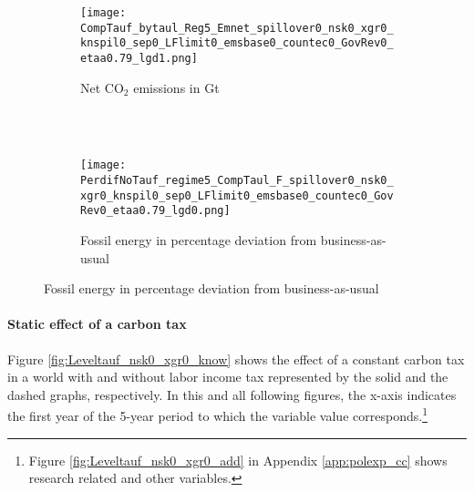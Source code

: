 \begin{figure}[h!!]
	\centering
	\caption{A constant carbon tax equal to US\$185 (2020 prices) per ton of carbon  }\label{fig:Leveltauf_nsk0_xgr0_know}		
	\begin{subfigure}[]{0.4\textwidth}
		\caption{Net CO$_2$ emissions in Gt \\ \ }
		\texttt{[image: CompTauf\_bytaul\_Reg5\_Emnet\_spillover0\_nsk0\_xgr0\_knspil0\_sep0\_LFlimit0\_emsbase0\_countec0\_GovRev0\_etaa0.79\_lgd1.png]}
	\end{subfigure}	
	\begin{minipage}[]{0.1\textwidth}
		\
	\end{minipage}
	\begin{subfigure}[]{0.4\textwidth}
		\caption{Fossil energy in percentage deviation from business-as-usual}
		\texttt{[image: PerdifNoTauf\_regime5\_CompTaul\_F\_spillover0\_nsk0\_xgr0\_knspil0\_sep0\_LFlimit0\_emsbase0\_countec0\_GovRev0\_etaa0.79\_lgd0.png]}
	\end{subfigure}
\end{figure} 

\paragraph{Static effect of a carbon tax}
Figure \ref{fig:Leveltauf_nsk0_xgr0_know} shows the effect of a constant carbon tax in a world with and without labor income tax represented by the solid and the dashed graphs, respectively. In this and all following figures, the x-axis indicates the first year of the 5-year period to which the variable value corresponds.\footnote{ Figure \ref{fig:Leveltauf_nsk0_xgr0_add} in Appendix \ref{app:polexp_cc} shows research related and other variables.}  


